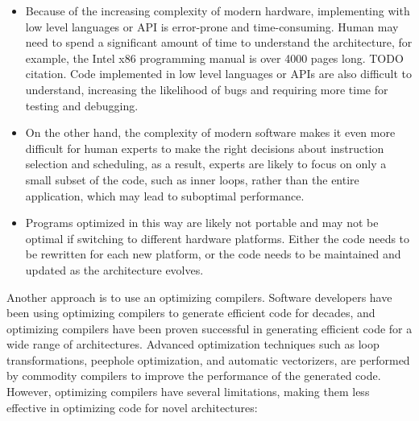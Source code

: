 \begin{itemize}
%
\item Because of the increasing complexity of modern hardware,
implementing with low level languages or API is error-prone and
time-consuming. Human may need to spend a significant amount of time
to understand the architecture, for example, the Intel x86 programming
manual is over 4000 pages long. TODO citation. Code implemented in low
level languages or APIs are also difficult to understand, increasing
the likelihood of bugs and requiring more time for testing and
debugging.

\item On the other hand, the complexity of modern software makes it even
more difficult for human experts to make the right decisions about
instruction selection and scheduling, as a result, experts are likely
to focus on only a small subset of the code, such as inner loops,
rather than the entire application, which may lead to suboptimal
performance.

\item Programs optimized in this way are likely not portable and
may not be optimal if switching to different hardware platforms.
%
Either the code needs to be rewritten for each new platform, or the
code needs to be maintained and updated as the architecture evolves.

\end{itemize}


Another approach is to use an optimizing compilers.
%
Software developers have been using optimizing compilers to generate
efficient code for decades, and optimizing compilers have been proven
successful in generating efficient code for a wide range of
architectures.
%
Advanced optimization techniques such as loop transformations,
peephole optimization, and automatic vectorizers, are performed by
commodity compilers to improve the performance of the generated code.
%
However, optimizing compilers have several limitations, making them
less effective in optimizing code for novel architectures:

